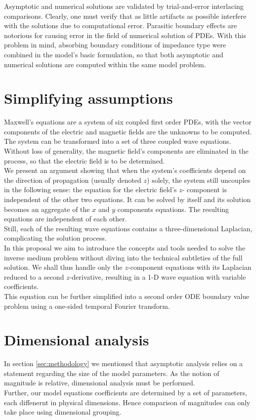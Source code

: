 \documentclass[12pt,twoside]{report}
\begin{document}
Asymptotic and numerical solutions are validated by trial-and-error interlacing comparisons. Clearly, one must verify that as little artifacts as possible interfere with the solutions due to computational error. Parasitic boundary effects are notorious for causing error in the field of numerical solution of PDEs. With this problem in mind, absorbing boundary conditions of impedance type were combined in the model's basic formulation, so that both asymptotic and numerical solutions are computed within the same model problem.\\
   
\section{Simplifying assumptions}
Maxwell's equations are a  system of six coupled first order PDEs, with the vector components of the electric and magnetic fields are the unknowns to be computed. The system can be transformed into a set of three coupled wave equations. Without loss of generality, the magnetic field's components are eliminated in the process, so that the electric field is to be determined. \\

We present an argument showing that when the system's coefficients depend on the direction of propagation (usually denoted $z$) solely, the system still uncouples in the following sense: the equation for the electric field's $z$- component is independent of the other two equations. It can be solved by itself and its solution becomes an aggregate of the $x$ and $y$ components equations. The resulting equations are independent of each other.\\

Still, each of the resulting wave equations contains a three-dimensional Laplacian, complicating the solution process.\\
In this proposal we aim to introduce the concepts and tools needed to solve the inverse medium problem without diving into the technical subtleties of the full solution. We shall thus handle only the $z$-component equations with its Laplacian reduced to a second $z$-derivative, resulting in a 1-D wave equation with variable coefficients. \\
This equation can be further simplified into a second order ODE boundary value problem using a one-sided temporal Fourier transform. 

\section{Dimensional analysis}
\label{sec:IntoDimAnaslysis}
In section \ref{sec:methodology} we mentioned that asymptotic analysis relies on a statement regarding the size of the model parameters. As the notion of magnitude is relative, dimensional analysis must be performed. \\
Further, our model equations coefficients are determined by a set of parameters, each diffenernt in physical dimensions. Hence comparison of magnitudes can only take place using dimensional grouping.
\end{document}
